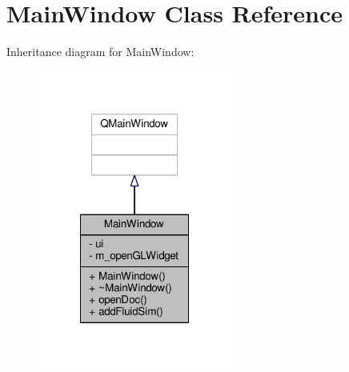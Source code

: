 \hypertarget{class_main_window}{\section{Main\-Window Class Reference}
\label{class_main_window}
}


Inheritance diagram for Main\-Window\-:\nopagebreak
\begin{figure}[H]
\begin{center}
\leavevmode
\includegraphics[width=180pt]{class_main_window__inherit__graph}
\end{center}
\end{figure}


